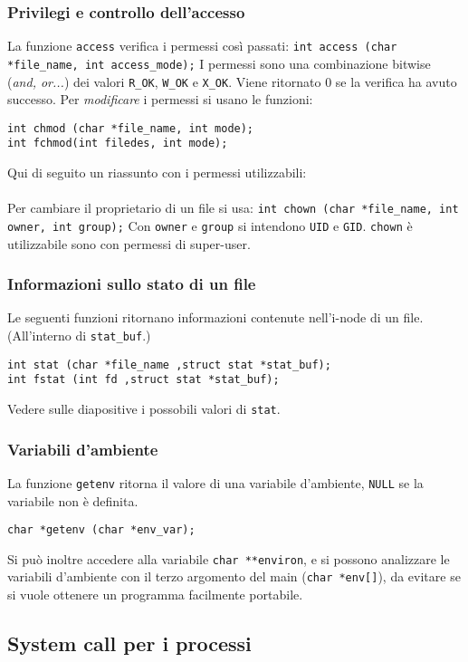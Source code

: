 \documentclass[a4paper, 10pt]{article}
\begin{document}
\subsubsection{Privilegi e controllo dell'accesso}
La funzione \verb|access| verifica i permessi così passati:
\verb|int access (char *file_name, int access_mode);|
I permessi sono una combinazione bitwise (\textit{and, or...}) dei valori \verb|R_OK|, \verb|W_OK| e \verb|X_OK|. Viene ritornato 0 se la verifica ha avuto successo.
Per \textit{modificare} i permessi si usano le funzioni:
\begin{verbatim}
int chmod (char *file_name, int mode);
int fchmod(int filedes, int mode);
\end{verbatim}

Qui di seguito un riassunto con i permessi utilizzabili: \\ \\
Per cambiare il proprietario di un file si usa:
\verb|int chown (char *file_name, int owner, int group);|
Con \verb|owner| e \verb|group| si intendono \verb|UID| e \verb|GID|. \verb|chown| è utilizzabile sono con permessi di super-user.

\subsubsection{Informazioni sullo stato di un file}
Le seguenti funzioni ritornano informazioni contenute nell'i-node di un file. (All'interno di \verb|stat_buf|.)
\begin{verbatim}
int stat (char *file_name ,struct stat *stat_buf);
int fstat (int fd ,struct stat *stat_buf);
\end{verbatim}
Vedere sulle diapositive i possobili valori di \verb|stat|.

\subsubsection{Variabili d'ambiente}
La funzione \verb|getenv| ritorna il valore di una variabile d'ambiente, \verb|NULL| se la variabile non è definita.
\begin{verbatim}
char *getenv (char *env_var);
\end{verbatim}
Si può inoltre accedere alla variabile \verb|char **environ|, e si possono analizzare le variabili d'ambiente con il terzo argomento del main (\verb|char *env[]|), da evitare se si vuole ottenere un programma facilmente portabile.
\newpage
\subsection{System call per i processi}
\end{document}
